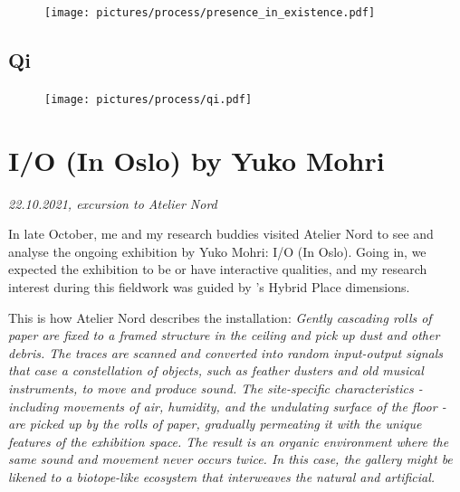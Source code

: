 \begin{figure}[H]
\texttt{[image: pictures/process/presence\_in\_existence.pdf]}
\caption{}
\centering 
\end{figure}

\subsection{Qi}

\begin{figure}[H]
\texttt{[image: pictures/process/qi.pdf]}
\caption{}
\centering 
\end{figure}


\section{I/O (In Oslo) by Yuko Mohri}
\par
\emph{22.10.2021, excursion to Atelier Nord}
\par

In late October, me and my research buddies visited Atelier Nord to see and analyse the ongoing exhibition by Yuko Mohri: I/O (In Oslo). Going in, we expected the exhibition to be or have interactive qualities, and my research interest during this fieldwork was guided by \autocite{hybridplace_ciolfi}'s Hybrid Place dimensions. 

This is how Atelier Nord describes the installation: 
\emph{Gently cascading rolls of paper are fixed to a framed structure in the ceiling and pick up dust and other debris. The traces are scanned and converted into random input-output signals that case a constellation of objects, such as feather dusters and old musical instruments, to move and produce sound. The site-specific characteristics - including movements of air, humidity, and the undulating surface of the floor - are picked up by the rolls of paper, gradually permeating it with the unique features of the exhibition space. The result is an organic environment where the same sound and movement never occurs twice. In this case, the gallery might be likened to a biotope-like ecosystem that interweaves the natural and artificial.} \autocite{yukomohri_web}

